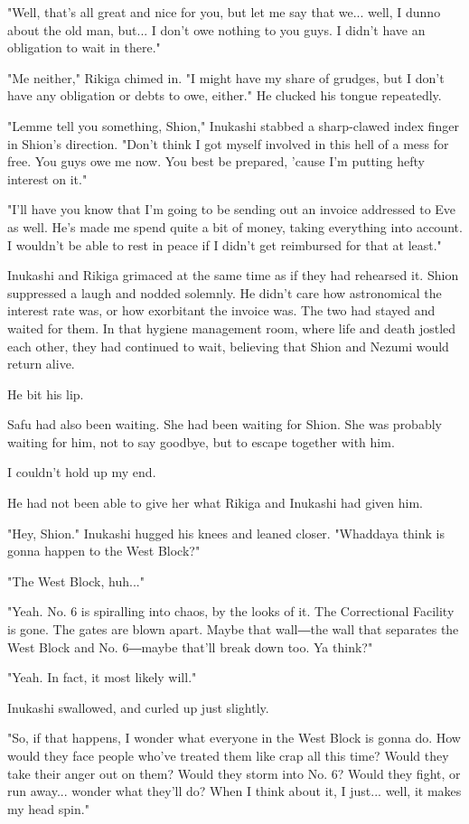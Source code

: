 "Well, that's all great and nice for you, but let me say that we...
well, I dunno about the old man, but... I don't owe nothing to you guys.
I didn't have an obligation to wait in there."

"Me neither," Rikiga chimed in. "I might have my share of grudges, but I
don't have any obligation or debts to owe, either." He clucked his
tongue repeatedly.

"Lemme tell you something, Shion," Inukashi stabbed a sharp-clawed index
finger in Shion's direction. "Don't think I got myself involved in this
hell of a mess for free. You guys owe me now. You best be prepared,
'cause I'm putting hefty interest on it."

"I'll have you know that I'm going to be sending out an invoice
addressed to Eve as well. He's made me spend quite a bit of money,
taking everything into account. I wouldn't be able to rest in peace if I
didn't get reimbursed for that at least."

Inukashi and Rikiga grimaced at the same time as if they had rehearsed
it. Shion suppressed a laugh and nodded solemnly. He didn't care how
astronomical the interest rate was, or how exorbitant the invoice was.
The two had stayed and waited for them. In that hygiene management room,
where life and death jostled each other, they had continued to wait,
believing that Shion and Nezumi would return alive.

He bit his lip.

Safu had also been waiting. She had been waiting for Shion. She was
probably waiting for him, not to say goodbye, but to escape together
with him.

I couldn't hold up my end.

He had not been able to give her what Rikiga and Inukashi had given him.

"Hey, Shion." Inukashi hugged his knees and leaned closer. "Whaddaya
think is gonna happen to the West Block?"

"The West Block, huh..."

"Yeah. No. 6 is spiralling into chaos, by the looks of it. The
Correctional Facility is gone. The gates are blown apart. Maybe that
wall―the wall that separates the West Block and No. 6―maybe that'll
break down too. Ya think?"

"Yeah. In fact, it most likely will."

Inukashi swallowed, and curled up just slightly.

"So, if that happens, I wonder what everyone in the West Block is gonna
do. How would they face people who've treated them like crap all this
time? Would they take their anger out on them? Would they storm into No.
6? Would they fight, or run away... wonder what they'll do? When I think
about it, I just... well, it makes my head spin."

